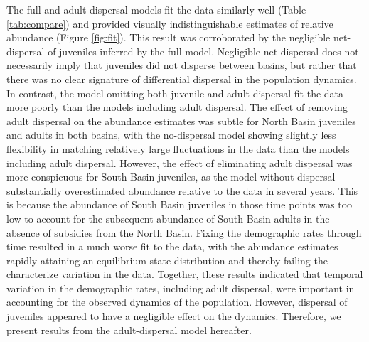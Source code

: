 \documentclass[11pt]{article}
\begin{document}
The full and adult-dispersal models fit the data similarly well (Table \ref{tab:compare})
and provided visually indistinguishable estimates of 
relative abundance (Figure \ref{fig:fit}). 
This result was corroborated by the negligible net-dispersal
of juveniles inferred by the full model.
Negligible net-dispersal does not necessarily imply 
that juveniles did not disperse between basins,
but rather that there was no clear signature of differential dispersal 
in the population dynamics.
In contrast, the model omitting both juvenile and adult dispersal fit
the data more poorly than the models including adult dispersal.
The effect of removing adult dispersal on the abundance estimates was subtle
for North Basin juveniles and adults in both basins,
with the no-dispersal model showing slightly less flexibility in matching 
relatively large fluctuations in the data than the models including adult dispersal.
However, 
the effect of eliminating adult dispersal was more conspicuous for South Basin juveniles,
as the model without dispersal substantially overestimated abundance relative to the data
in several years.
This is because the abundance of South Basin juveniles in those time points was too low 
to account for the subsequent abundance of South Basin adults 
in the absence of subsidies from the North Basin.
Fixing the demographic rates through time resulted in a much worse fit to the data,
with the abundance estimates rapidly attaining an equilibrium state-distribution
and thereby failing the characterize variation in the data.
Together, these results indicated that temporal variation in the demographic rates,
including adult dispersal, were important in accounting 
for the observed dynamics of the population.
However, dispersal of juveniles appeared to have a negligible effect on the dynamics.
Therefore, we present results from the adult-dispersal model hereafter.
\end{document}
